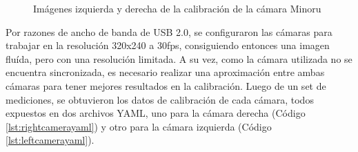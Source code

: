 \begin{figure}[!ht]
    \centering
    \qquad
    \caption{Imágenes izquierda y derecha de la calibración de la cámara Minoru}
    \label{fig:minorurightleft}
\end{figure}

Por razones de ancho de banda de USB 2.0, se configuraron las cámaras para trabajar en la resolución 320x240 a 30fps, consiguiendo entonces una imagen fluída, pero con una resolución limitada. A su vez, como la cámara utilizada no se encuentra sincronizada, es necesario realizar una aproximación entre ambas cámaras para tener mejores resultados en la calibración. Luego de un set de mediciones, se obtuvieron los datos de calibración de cada cámara, todos expuestos en dos archivos YAML, uno para la cámara derecha (Código \ref{lst:rightcamerayaml}) y otro para la cámara izquierda (Código \ref{lst:leftcamerayaml}).



\fi

\ifimagenes
